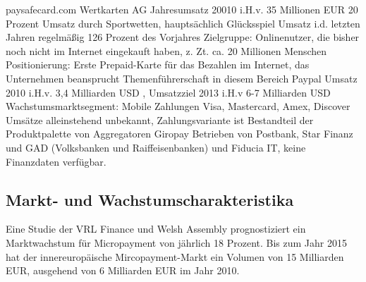paysafecard.com Wertkarten AG   \newline \newline
Jahresumsatz 20010 i.H.v. 35 Millionen EUR 
20 Prozent Umsatz durch Sportwetten, hauptsächlich Glücksspiel 
Umsatz i.d. letzten Jahren regelmäßig 126 Prozent des Vorjahres \cite{d1} \newline
\newline Zielgruppe: Onlinenutzer, die bisher noch nicht im Internet eingekauft haben, z.
Zt. ca. 20 Millionen Menschen \newline \newline
Positionierung: Erste Prepaid-Karte für das Bezahlen im Internet, das
Unternehmen beansprucht Themenführerschaft in diesem Bereich \cite{d2} \newline
\newline
Paypal  \newline \newline
Umsatz 2010 i.H.v. 3,4 Milliarden USD \cite{d3}, \cite{d4}\newline
Umsatzziel 2013 i.H.v 6-7 Milliarden USD \cite{d4}\newline 
Wachstumsmarktsegment: Mobile Zahlungen \cite{d5}\newline \newline
Visa, Mastercard, Amex, Discover \newline \newline
Umsätze alleinstehend unbekannt, Zahlungsvariante ist Bestandteil der 
Produktpalette von Aggregatoren \newline \newline
Giropay\newline \newline
Betrieben von Postbank, Star Finanz und GAD (Volksbanken und Raiffeisenbanken)
und Fiducia IT, keine Finanzdaten verfügbar.\newline \newline

\subsection{Markt- und Wachstumscharakteristika}

Eine Studie der VRL Finance und Welsh Assembly \cite{da2} prognostiziert ein
Marktwachstum für Micropayment von jährlich 18 Prozent. Bis zum Jahr 2015 hat 
der innereuropäische Mircopayment-Markt ein Volumen von 15 Milliarden EUR,
ausgehend von 6 Milliarden EUR im Jahr 2010. \newline 

